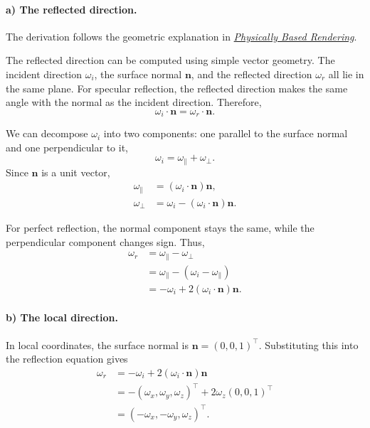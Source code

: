 
\paragraph{a) The reflected direction.}

The derivation follows the geometric explanation in
\href{https://www.pbr-book.org/3ed-2018/Reflection_Models/Specular_Reflection_and_Transmission#SpecularReflection}{\textit{Physically Based Rendering}}.

The reflected direction can be computed using simple vector geometry.
The incident direction $\omega_i$, the surface normal $\mathbf{n}$,
and the reflected direction $\omega_r$ all lie in the same plane.
For specular reflection, the reflected direction makes the same
angle with the normal as the incident direction. Therefore,
\[
    \omega_i \cdot \mathbf{n}
    = \omega_r \cdot \mathbf{n}.
\]

We can decompose $\omega_i$ into two components: one parallel
to the surface normal and one perpendicular to it,
\[
    \omega_i = \omega_{\parallel} + \omega_{\perp}.
\]
Since $\mathbf{n}$ is a unit vector,
\[
\begin{aligned}
    \omega_{\parallel}
        &= (\omega_i \cdot \mathbf{n})\mathbf{n},\\
    \omega_{\perp}
        &= \omega_i - (\omega_i \cdot \mathbf{n})\mathbf{n}.
\end{aligned}
\]

For perfect reflection, the normal component stays the same,
while the perpendicular component changes sign. Thus,
\[
\begin{aligned}
    \omega_r
        &= \omega_{\parallel} - \omega_{\perp}\\
        &= \omega_{\parallel} - (\omega_i-\omega_{\parallel})\\
        &= -\omega_i + 2(\omega_i\cdot\mathbf{n})\mathbf{n}.
\end{aligned}
\]

\paragraph{b) The local direction.}

In local coordinates, the surface normal is
$\mathbf{n}=(0,0,1)^\top$. Substituting this into the
reflection equation gives
\[
\begin{aligned}
    \omega_r
        &= -\omega_i + 2(\omega_i\cdot\mathbf{n})\mathbf{n}\\
        &= -(\omega_x,\omega_y,\omega_z)^\top
           + 2\omega_z(0,0,1)^\top\\
        &= (-\omega_x,-\omega_y,\omega_z)^\top.
\end{aligned}
\]



